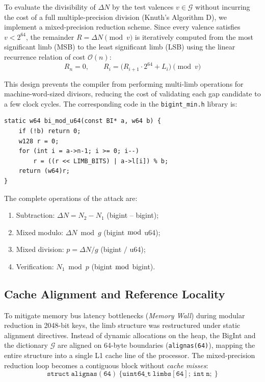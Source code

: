 \documentclass[12pt,a4paper]{article}
\theoremstyle{plain}
\begin{document}
To evaluate the divisibility of $\Delta N$ by the test valences
$v \in \mathcal{G}$ without incurring the cost of a full
multiple-precision division (Knuth's Algorithm D), we implement a
mixed-precision reduction scheme. Since every valence satisfies
$v < 2^{64}$, the remainder $R = \Delta N \pmod v$ is iteratively
computed from the most significant limb (MSB) to the least significant
limb (LSB) using the linear recurrence relation of cost $\mathcal{O}(n)$:
\[
R_n = 0,\qquad
R_i = \bigl( R_{i+1} \cdot 2^{64} + L_i \bigr) \pmod v
\]

This design prevents the compiler from performing multi-limb
operations for machine-word-sized divisors, reducing the cost of
validating each gap candidate to a few clock cycles. The corresponding
code in the \texttt{bigint\_min.h} library is:
\begin{verbatim}
static w64 bi_mod_u64(const BI* a, w64 b) {
    if (!b) return 0;
    w128 r = 0;
    for (int i = a->n-1; i >= 0; i--)
        r = ((r << LIMB_BITS) | a->l[i]) % b;
    return (w64)r;
}
\end{verbatim}

The complete operations of the attack are:
\begin{enumerate}
  \item Subtraction: $\Delta N = N_2 - N_1$ (bigint -- bigint);
  \item Mixed modulo: $\Delta N \bmod g$ (bigint $\bmod$ u64);
  \item Mixed division: $p = \Delta N / g$ (bigint $/$ u64);
  \item Verification: $N_1 \bmod p$ (bigint $\bmod$ bigint).
\end{enumerate}

\subsection{Cache Alignment and Reference Locality}

To mitigate memory bus latency bottlenecks (\textit{Memory Wall})
during modular reduction in 2048-bit keys, the limb structure was
restructured under static alignment directives. Instead of dynamic
allocations on the heap, the BigInt and the dictionary $\mathcal{G}$ are
aligned on 64-byte boundaries (\texttt{alignas(64)}), mapping the
entire structure into a single L1 cache line of the processor. The
mixed-precision reduction loop becomes a contiguous block without
\textit{cache misses}:
\[
\mathtt{struct\ alignas(64)\ \{ uint64\_t\ limbs[64];\ int\ n;\ \}}
\]
\end{document}
